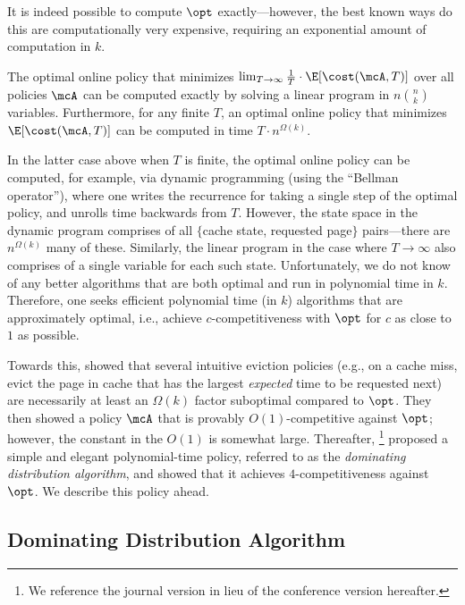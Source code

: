 It is indeed possible to compute $\opt$ exactly---however, the best known ways do this are computationally very expensive, requiring an exponential amount of computation in $k$.

\begin{theorem}
    \label{thm:opt-computation}
    The optimal online policy that minimizes $\lim_{T \to \infty}\frac{1}{T}\cdot\E[\cost(\mcA, T)]$ over all policies $\mcA$ can be computed exactly by solving a linear program in $n\binom{n}{k}$ variables. Furthermore, for any finite $T$, an optimal online policy that minimizes $\E[\cost(\mcA, T)]$ can be computed in time $T \cdot n^{\Omega(k)}$. %
\end{theorem}

In the latter case above when $T$ is finite, the optimal online policy can be computed, for example, via dynamic programming (using the ``Bellman operator''), where one writes the recurrence for taking a single step of the optimal policy, and unrolls time backwards from $T$. However, the state space in the dynamic program comprises of all $\{$cache state, requested page$\}$ pairs---there are $n^{\Omega(k)}$ many of these. Similarly, the linear program in the case where $T \to \infty$ also comprises of a single variable for each such state. Unfortunately, we do not know of any better algorithms that are both optimal and run in polynomial time in $k$. Therefore, one seeks efficient polynomial time (in $k$) algorithms that are approximately optimal, i.e., achieve $c$-competitiveness with $\opt$ for $c$ as close to $1$ as possible.

Towards this, \cite{karlin1992markov} showed that several intuitive eviction policies (e.g., on a cache miss, evict the page in cache that has the largest \textit{expected} time to be requested next) are necessarily at least an $\Omega(k)$ factor suboptimal compared to $\opt$. They then showed a policy $\mcA$ that is provably $O(1)$-competitive against $\opt$; however, the constant in the $O(1)$ is somewhat large. Thereafter, \cite{lund1999paging}\footnote{We reference the journal version \citep{lund1999paging} in lieu of the conference version \citep{lund1994ip} hereafter.} proposed a simple and elegant polynomial-time policy, referred to as the \textit{dominating distribution algorithm}, and showed that it achieves $4$-competitiveness against $\opt$. We describe this policy ahead.

\subsection{Dominating Distribution Algorithm}
\label{sec:dominating-distribution}

